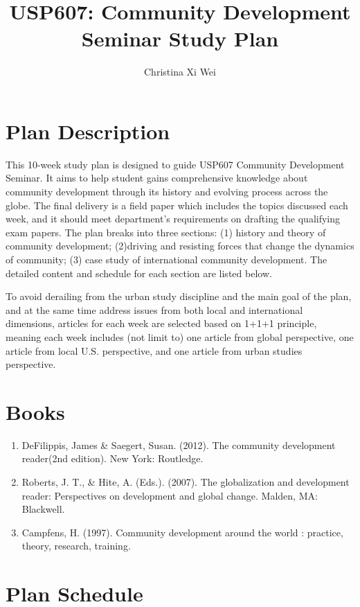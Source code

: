 \documentclass{article}
\title{USP607: Community Development Seminar Study Plan}
\author{Christina Xi Wei}
\begin{document}
\maketitle

\section{Plan Description}

    This 10-week study plan is designed to guide USP607 Community Development Seminar. It aims to help student gains comprehensive knowledge about community development through its history and evolving process across the globe. The final delivery is a field paper which includes the topics discussed each week, and it should meet department's requirements on drafting the qualifying exam papers. The plan breaks into three sections: (1) history and theory of community development; (2)driving and resisting forces that change the dynamics of community; (3) case study of international community development. The detailed content and schedule for each section are listed below.

    To avoid derailing from the urban study discipline and the main goal of the plan, and at the same time address issues from both local and international dimensions, articles for each week are selected based on 1+1+1 principle, meaning each week includes (not limit to) one article from global perspective, one article from local U.S. perspective, and one article from urban studies perspective.

\section {Books}
\begin{enumerate}
    \item DeFilippis, James & Saegert, Susan. (2012). The community development reader(2nd edition). New York: Routledge.
    \item Roberts, J. T., & Hite, A. (Eds.). (2007). The globalization and development reader: Perspectives on development and global change. Malden, MA: Blackwell. 
    \item Campfens, H. (1997). Community development around the world : practice, theory, research, training.
\end{enumerate}


\section{Plan Schedule}
\end{document}

